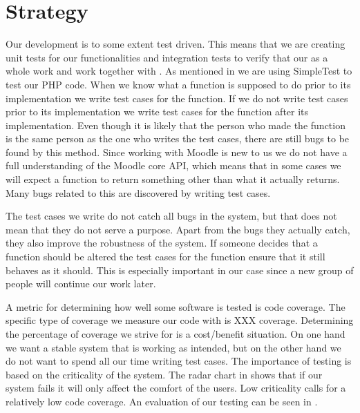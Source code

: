 \section{Strategy}
\label{sec:strategy}
\newcommand{\idealCC}{\todo{make this correct}XXX}
Our development is to some extent test driven.
This means that we are creating unit tests for our functionalities and integration tests to verify that our \subsystem{} as a whole work and work together with \moodle{}.
As mentioned in  we are using SimpleTest to test our PHP code.
When we know what a function is supposed to do prior to its implementation we write test cases for the function.
If we do not write test cases prior to its implementation we write test cases for the function after its implementation.
Even though it is likely that the person who made the function is the same person as the one who writes the test cases, there are still bugs to be found by this method.
Since working with Moodle is new to us we do not have a full understanding of the Moodle core API, which means that in some cases we will expect a function to return something other than what it actually returns.
Many bugs related to this are discovered by writing test cases.

The test cases we write do not catch all bugs in the system, but that does not mean that they do not serve a purpose.
Apart from the bugs they actually catch, they also improve the robustness of the system.
If someone decides that a function should be altered the test cases for the function ensure that it still behaves as it should.
This is especially important in our case since a new group of people will continue our work later.

A metric for determining how well some software is tested is code coverage. 
The specific type of coverage we measure our code with is \idealCC{} coverage. 
Determining the percentage of coverage we strive for is a cost/benefit situation.
On one hand we want a stable system that is working as intended, but on the other hand we do not want to spend all our time writing test cases.
The importance of testing is based on the criticality of the system.
The radar chart in  shows that if our system fails it will only affect the comfort of the users.
Low criticality calls for a relatively low code coverage.
An evaluation of our testing can be seen in .

